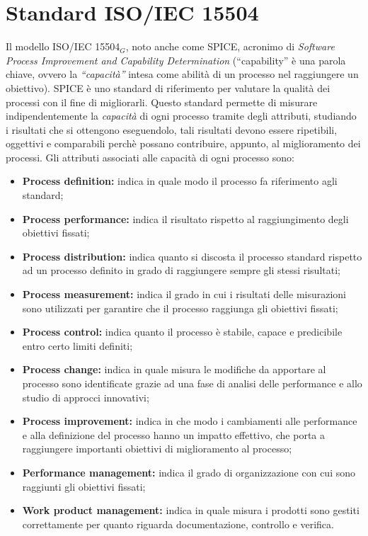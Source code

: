 \chapter{Standard ISO/IEC 15504}\label{Standard ISO/IEC 15504}
Il modello ISO/IEC 15504$_G$, noto anche come SPICE, acronimo di \textit{Software Process Improvement and Capability Determination} (“capability” è una parola chiave, ovvero la \textit{“capacità”} intesa come abilità di un processo nel raggiungere un obiettivo).
SPICE è uno standard di riferimento per valutare la qualità dei processi con il fine di migliorarli.
Questo standard permette di misurare indipendentemente la \textit{capacità} di ogni processo tramite degli attributi, studiando i risultati che si ottengono eseguendolo, tali risultati devono essere ripetibili, oggettivi e comparabili perchè possano contribuire, appunto, al miglioramento dei processi.
Gli attributi associati alle capacità di ogni processo sono:
\begin{itemize}
	\item \textbf{Process definition:} indica in quale modo il processo fa riferimento agli standard;
	\item \textbf{Process performance:} indica il risultato rispetto al raggiungimento degli 
		obiettivi fissati;
	\item \textbf{Process distribution:} indica quanto si discosta il processo standard rispetto ad un processo 
		definito in grado di raggiungere sempre gli stessi risultati; 
	\item \textbf{Process measurement:} indica il grado in cui i risultati delle misurazioni
		sono utilizzati per garantire che il processo raggiunga gli obiettivi fissati;
	\item \textbf{Process control:} indica quanto il processo è stabile, capace e predicibile 
		entro certo limiti definiti;
	\item \textbf{Process change:} indica in quale misura le modifiche da apportare al processo sono
	identificate grazie ad una fase di analisi delle performance e allo studio di approcci innovativi;
	\item \textbf{Process improvement:} indica in che modo i cambiamenti alle performance e alla definizione del processo 
		hanno un impatto effettivo, che porta a raggiungere importanti obiettivi di miglioramento al processo;
	\item \textbf{Performance management:} indica il grado di organizzazione con cui sono raggiunti gli obiettivi fissati;
	\item \textbf{Work product management:} indica in quale misura i prodotti sono gestiti correttamente per quanto riguarda documentazione, controllo e verifica.
\end{itemize}
